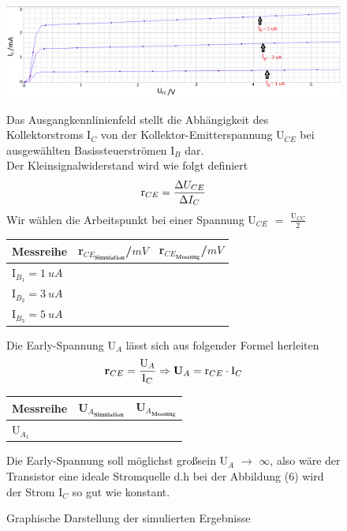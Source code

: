 \begin{figure}[h]
\begin{center}
\vspace{8cm}
\includegraphics[width=1\textwidth]{Versuch3AllinOne}
\caption{Graphische Darstellung der simulierten Ergebnisse}
\end{center}
Das Ausgangkennlinienfeld stellt die Abh\"angigkeit des Kollektorstroms I$_C$ von der Kollektor-Emitterspannung U$_{CE}$ bei ausgew\"ahlten Basissteuerstr\"omen I$_B$ dar. \\
Der Kleinsignalwiderstand wird wie folgt definiert \\
\begin{equation*}
\text{\text{r$_{CE}$}} = \frac{\Delta U_{CE}}{\Delta I_C}
\end{equation*}
Wir w\"ahlen die Arbeitspunkt  bei einer Spannung U$_{CE}$ $=$ $\frac{\text{U$_{CC}$}}{2}$
\begin{center} 
\begin{tabular}{|l|l|l|}
\hline
Messreihe & r$_{{CE}_{\textbf{Simulation}}}$/$mV$ & r$_{{CE}_{\textbf{Messung}}}$/$mV$\\
\hline
I$_{B_1} = 1~uA$ &  &  \\
\hline
I$_{B_2} = 3~uA$ &  &  \\
\hline
I$_{B_3} = 5~uA$ &  &  \\
\hline
\end{tabular}
\end{center}
Die Early-Spannung U$_A$ l\"asst sich aus folgender Formel herleiten
\begin{equation*}
\text{\textbf{r$_{CE}$}} = \frac{\text{U$_A$}}{\text{I$_C$}} \Rightarrow 
\text{\textbf{\text{U$_A$}}} = \text{r$_{CE}$} \cdot \text{I$_C$}
\end{equation*}
\begin{center}
\begin{tabular}{|l|l|l|}
\hline
Messreihe & U$_{A_{\textbf{Simulation}}}$ & U$_{{A}_{\textbf{Messung}}}$\\
\hline
U$_{A_1}$  &  &  \\
\hline
\end{tabular}
\end{center}
\newpage
Die Early-Spannung soll m\"oglichst gro\ss  sein U$_A$ $\rightarrow$ $\infty$, also w\"are der Transistor eine ideale Stromquelle
 d.h bei der Abbildung (6) wird der Strom I$_C$ so gut wie konstant.  
\end{figure}




